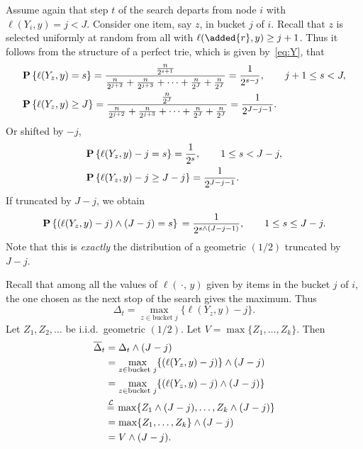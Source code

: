 \documentclass{article}
\newcommand{\oDelta}{{\overline{\Delta}}}
\newcommand\cL{{\cal L}}
\newcommand{\p}[1]{{\textbf P}\left\{#1\right\}}
\newcommand{\eql}{\,{\buildrel \cL \over =}\,}
\begin{document}
Assume again that step $t$ of the search departs from node $i$ with
$\ell(Y_i,y) = j< J$. Consider one item, say $z$, in bucket $j$ of $i$.
Recall that $z$ is selected uniformly at random from all  with
$\ell(\added{r} ,y) \ge j+1$.  Thus it follows from the structure of a perfect
trie, which is given by~\eqref{eq:Y}, that
\begin{align*}
    & \p{\ell(Y_{z},y) = s} 
= \frac{\frac{n}{2^{s+1}}}{\frac{n} {2^{j+2}}+ \frac{n} {2^{j+3}} + \dots +
    \frac{n}{2^{J}} + \frac{n}{2^{J}}}
    = \frac{1}{2^{s-j}}, \qquad j+1 \le s < J, \\
    & \p{\ell(Y_{z},y) \ge J} 
= \frac{\frac{n}{2^{J}}}{\frac{n} {2^{j+2}}+ \frac{n} {2^{j+3}} + \dots +
    \frac{n}{2^{J}} + \frac{n}{2^{J}}}
    = \frac{1}{2^{J-j-1}}.
\end{align*}
Or shifted by $-j$,
\begin{align*}
    & \p{\ell(Y_{z},y) - j = s} 
    = \frac{1}{2^{s}}, \qquad 1 \le s < J-j, \\
    & \p{\ell(Y_{z},y) - j \ge J-j} 
    = \frac{1}{2^{J-j-1}}.
\end{align*}
If truncated by $J-j$, we obtain
\begin{align*}
    \p{(\ell(Y_{z},y) - j) \wedge (J-j) = s}
\, = \frac{1}{2^{s \wedge (J-j-1)}},
    \qquad 1 \le s \le J-j.
\end{align*}
Note that this is \emph{exactly} the distribution of a geometric $(1/2)$ truncated by $J-j$.

Recall that among all the values of $\ell(\,\cdot,\,y)$ given by items in the
bucket $j$ of $i$, the one chosen as the next stop of the search gives the maximum.
Thus
$$
\Delta_t
= \max_{z \in \text{bucket } j}\{\ell(Y_{z},y) - j\}.
$$ 
Let $Z_1,Z_2,\ldots$ be i.i.d.\ geometric $(1/2)$.  Let $V =
\max\{Z_1,\ldots,Z_k\}$.
Then
\begin{align*}
    \oDelta_t
    & = \Delta_t \wedge (J-j) \\
    & = \max_{z \in \text{bucket } j}\{(\ell(Y_z, y) - j)\} \wedge (J-j) \\
    & = \max_{z \in \text{bucket } j}\{(\ell(Y_z, y) - j) \wedge (J-j)\} \\
    & \eql \max\{Z_1 \wedge (J-j),\ldots,Z_k \wedge (J-j)\} \\
    & = \max\{Z_1,\ldots,Z_k\} \wedge (J-j) \\
    & = V \wedge (J-j).
\end{align*}
\end{document}
